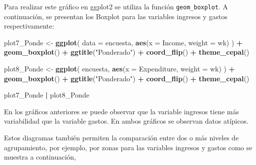 \documentclass[
  spanish,
  12pt,
]{book}
\newenvironment{Shaded}{\begin{snugshade}}{\end{snugshade}}
\newcommand{\AttributeTok}[1]{\textcolor[rgb]{0.13,0.29,0.53}{#1}}
\newcommand{\FunctionTok}[1]{\textcolor[rgb]{0.13,0.29,0.53}{\textbf{#1}}}
\newcommand{\NormalTok}[1]{#1}
\newcommand{\OtherTok}[1]{\textcolor[rgb]{0.56,0.35,0.01}{#1}}
\newcommand{\SpecialCharTok}[1]{\textcolor[rgb]{0.81,0.36,0.00}{\textbf{#1}}}
\newcommand{\StringTok}[1]{\textcolor[rgb]{0.31,0.60,0.02}{#1}}
\begin{document}
Para realizar este gráfico en ggplot2 se utiliza la función \texttt{geom\_boxplot}. A continuación, se presentan los Boxplot para las variables ingresos y gastos respectivamente:

\begin{Shaded}
\begin{Highlighting}[]
\NormalTok{plot7\_Ponde }\OtherTok{\textless{}{-}} \FunctionTok{ggplot}\NormalTok{(}
  \AttributeTok{data =}\NormalTok{ encuesta, }\FunctionTok{aes}\NormalTok{(}\AttributeTok{x =}\NormalTok{ Income, }\AttributeTok{weight =}\NormalTok{ wk)}
\NormalTok{) }\SpecialCharTok{+}
  \FunctionTok{geom\_boxplot}\NormalTok{() }\SpecialCharTok{+}
  \FunctionTok{ggtitle}\NormalTok{(}\StringTok{"Ponderado"}\NormalTok{) }\SpecialCharTok{+}
  \FunctionTok{coord\_flip}\NormalTok{() }\SpecialCharTok{+}
  \FunctionTok{theme\_cepal}\NormalTok{()}


\NormalTok{plot8\_Ponde }\OtherTok{\textless{}{-}} \FunctionTok{ggplot}\NormalTok{(}
\NormalTok{  encuesta,}
  \FunctionTok{aes}\NormalTok{(}\AttributeTok{x =}\NormalTok{ Expenditure, }\AttributeTok{weight =}\NormalTok{ wk)}
\NormalTok{) }\SpecialCharTok{+}
  \FunctionTok{geom\_boxplot}\NormalTok{() }\SpecialCharTok{+}
  \FunctionTok{ggtitle}\NormalTok{(}\StringTok{"Ponderado"}\NormalTok{) }\SpecialCharTok{+}
  \FunctionTok{coord\_flip}\NormalTok{() }\SpecialCharTok{+}
  \FunctionTok{theme\_cepal}\NormalTok{()}

\NormalTok{plot7\_Ponde }\SpecialCharTok{|}\NormalTok{ plot8\_Ponde}
\end{Highlighting}
\end{Shaded}

En los gráficos anteriores se puede observar que la variable ingresos tiene más variabilidad que la variable gastos. En ambos gráficos se observan datos atípicos.

Estos diagramas también permiten la comparación entre dos o más niveles de agrupamiento, por ejemplo, por zonas para las variables ingresos y gastos como se muestra a continuación,
\end{document}
